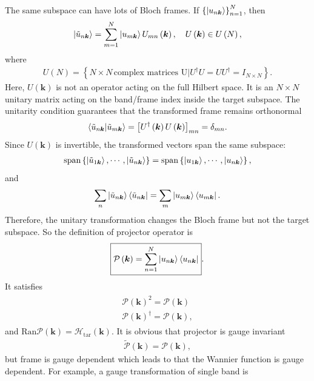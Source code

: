 \documentclass[12pt, oneside]{article}
\newcommand{\mr}[1]{\mathrm{#1}}
\newcommand{\p}[1]{\left(#1\right)}
\newcommand{\bb}[1]{\left[#1\right]}
\newcommand{\br}[1]{\left\{#1\right\}}
\numberwithin{equation}{subsection}
\begin{document}
The same subspace can have lots of Bloch frames. If \(\br{\ket{u_{n \bm{k}}}}^{N}_{n = 1}\), then 
\begin{align}
	\ket{\tilde{u}_{n\bm{k}}}=\sum^{N}_{m=1}\ket{u_{m\bm{k}}}U_{mn}\p{\bm{k}},\quad U\p{\bm{k}}\in U\p{N},
\end{align}
where 
\begin{align}
	U \p{N} = \br{N \times N \, \text{complex matrices U} | U^\dagger U = U U^\dagger = I_{N \times N}}.
\end{align}
Here, \(U \p{\bm{k}}\) is not an operator acting on the full Hilbert space. It is an \(N \times N\) unitary matrix acting on the band/frame index inside the target subspace. The unitarity condition guarantees that the transformed frame remains orthonormal 
\begin{align}
	\braket{\tilde{u}_{n \bm{k}} | \tilde{u}_{m \bm{k}}} = \bb{U^\dagger \p{\bm{k}} U \p{\bm{k}}}_{mn} = \delta_{mn}.
\end{align}
Since \(U \p{\bm{k}}\) is invertible, the transformed vectors span the same subspace:
\begin{align}
	\mr{span} \br{\ket{\tilde{u}_{1 \bm{k}}}, \cdots, \ket{\tilde{u}_{n \bm{k}}}} = \mr{span} \br{\ket{u_{1 \bm{k}}}, \cdots, \ket{u_{n \bm{k}}}},
\end{align}
and
\begin{align}
	\sum_n \ket{\tilde{u}_{n\bm{k}}}\bra{\tilde{u}_{n\bm{k}}} = \sum_m \ket{u_{m \bm{k}}}\bra{u_{m \bm{k}}}.
\end{align}
Therefore, the unitary transformation changes the Bloch frame but not the target subspace. So the definition of projector operator is 
\begin{align}
	\boxed{
		\mathcal{P} \p{\bm{k}} = \sum^{N}_{n = 1} \ket{u_{n \bm{k}}} \bra{u_{n \bm{k}}}
	}.
\end{align}
It satisfies 
\begin{align}
	\begin{split}
		\mathcal{P} \p{\bm{k}}^2 = \mathcal{P} \p{\bm{k}} \\
		\mathcal{P} \p{\bm{k}}^{\dagger} = \mathcal{P} \p{\bm{k}},  
	\end{split}
\end{align}
and \(\mr{Ran} \mathcal{P} \p{\bm{k}} = \mathcal{H}_{\mr{tar}} \p{\bm{k}}\). It is obvious that projector is gauge invariant
\begin{align}
	\tilde{\mathcal{P}}  \p{\bm{k}} = \mathcal{P} \p{\bm{k}},
\end{align}
but frame is gauge dependent which leads to that the Wannier function is gauge dependent. For example, a gauge transformation of single band is 
\end{document}
